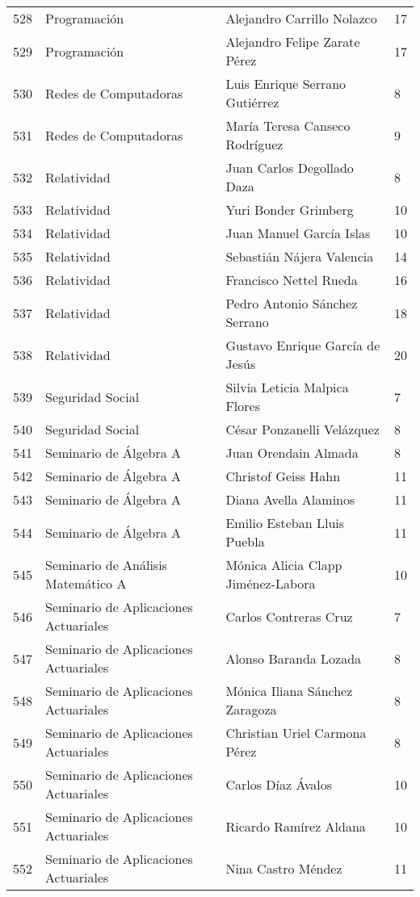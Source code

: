 \begin{table}[ht]
\begin{tabular}{rlll}
  528 & Programación & Alejandro Carrillo Nolazco & 17 \\ 
  529 & Programación & Alejandro Felipe Zarate Pérez & 17 \\ 
  530 & Redes de Computadoras & Luis Enrique Serrano Gutiérrez & 8 \\ 
  531 & Redes de Computadoras & María Teresa Canseco Rodríguez & 9 \\ 
  532 & Relatividad & Juan Carlos Degollado Daza & 8 \\ 
  533 & Relatividad & Yuri Bonder Grimberg & 10 \\ 
  534 & Relatividad & Juan Manuel García Islas & 10 \\ 
  535 & Relatividad & Sebastián Nájera Valencia & 14 \\ 
  536 & Relatividad & Francisco Nettel Rueda & 16 \\ 
  537 & Relatividad & Pedro Antonio Sánchez Serrano & 18 \\ 
  538 & Relatividad & Gustavo Enrique García de Jesús & 20 \\ 
  539 & Seguridad Social & Silvia Leticia Malpica Flores & 7 \\ 
  540 & Seguridad Social & César Ponzanelli Velázquez & 8 \\ 
  541 & Seminario de Álgebra A & Juan Orendain Almada & 8 \\ 
  542 & Seminario de Álgebra A & Christof Geiss Hahn & 11 \\ 
  543 & Seminario de Álgebra A & Diana Avella Alaminos & 11 \\ 
  544 & Seminario de Álgebra A & Emilio Esteban Lluis Puebla & 11 \\ 
  545 & Seminario de Análisis Matemático A & Mónica Alicia Clapp Jiménez-Labora & 10 \\ 
  546 & Seminario de Aplicaciones Actuariales & Carlos Contreras Cruz & 7 \\ 
  547 & Seminario de Aplicaciones Actuariales & Alonso Baranda Lozada & 8 \\ 
  548 & Seminario de Aplicaciones Actuariales & Mónica Iliana Sánchez Zaragoza & 8 \\ 
  549 & Seminario de Aplicaciones Actuariales & Christian Uriel Carmona Pérez & 8 \\ 
  550 & Seminario de Aplicaciones Actuariales & Carlos Díaz Ávalos & 10 \\ 
  551 & Seminario de Aplicaciones Actuariales & Ricardo Ramírez Aldana & 10 \\ 
  552 & Seminario de Aplicaciones Actuariales & Nina Castro Méndez & 11 \\ 

\end{tabular}
\end{table}
